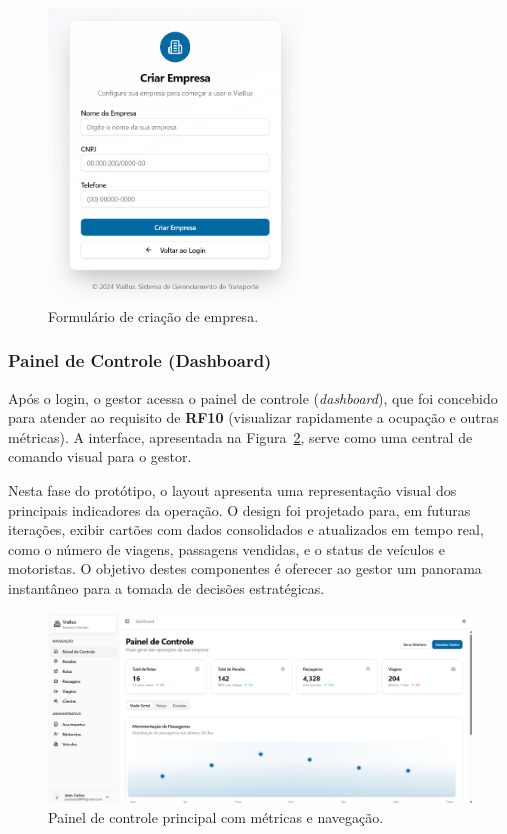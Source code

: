 \begin{figure}[H]
 \centering
 \includegraphics[width=0.6\textwidth]{imagens/criacao-empresa.png}
 \caption{Formulário de criação de empresa.}
 \label{fig:criacao-empresa}
\end{figure}

\subsubsection{Painel de Controle (Dashboard)}
Após o login, o gestor acessa o painel de controle (\textit{dashboard}), que foi concebido para atender ao requisito de \textbf{RF10} (visualizar rapidamente a ocupação e outras métricas). A interface, apresentada na Figura~\ref{fig:dashboard}, serve como uma central de comando visual para o gestor.

Nesta fase do protótipo, o layout apresenta uma representação visual dos principais indicadores da operação. O design foi projetado para, em futuras iterações, exibir cartões com dados consolidados e atualizados em tempo real, como o número de viagens, passagens vendidas, e o status de veículos e motoristas. O objetivo destes componentes é oferecer ao gestor um panorama instantâneo para a tomada de decisões estratégicas.

\begin{figure}[H]
 \centering
 \includegraphics[width=1\textwidth]{imagens/dashboard.png}
 \caption{Painel de controle principal com métricas e navegação.}
 \label{fig:dashboard}
\end{figure}

